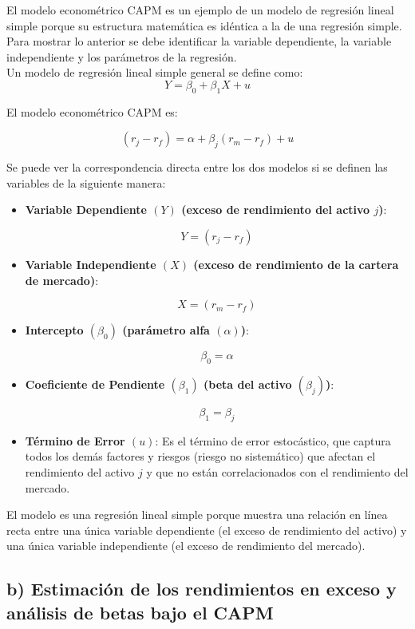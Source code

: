 \documentclass[12pt]{article}
\begin{document}
El modelo econométrico CAPM es un ejemplo de un 
modelo de regresión lineal simple porque su estructura matemática es idéntica a la de una regresión simple. 
Para mostrar lo anterior se debe identificar la variable dependiente, la variable independiente y los parámetros de la regresión.\\

Un modelo de regresión lineal simple general se define como:
\[
Y = \beta_{0} + \beta_{1}X + u
\]

El modelo econométrico CAPM es:

\[
(r_{j} - r_{f}) = \alpha + \beta_{j}(r_{m} - r_{f}) + u
\]

Se puede ver la correspondencia directa entre los dos modelos si se definen las variables de la siguiente manera:

\begin{itemize}
    \item \textbf{Variable Dependiente $(Y)$ (exceso de rendimiento del activo $j$)}: 

    \[
    Y = (r_{j} - r_{f})
    \]
        
    \item \textbf{Variable Independiente $(X)$ (exceso de rendimiento de la cartera de mercado)}: 

    \[
    X = (r_{m} - r_{f})
    \]
    
    \item \textbf{Intercepto $(\beta_{0})$ (parámetro alfa $(\alpha)$)}:

    \[
    \beta_{0} = \alpha
    \]    
    
    \item \textbf{Coeficiente de Pendiente $(\beta_{1})$ (beta del activo $(\beta_{j})$)}:

    \[
    \beta_{1} = \beta_{j}
    \] 
    
    \item \textbf{Término de Error $(u)$}: Es el término de error estocástico, que captura todos los demás factores y riesgos (riesgo no sistemático) 
    que afectan el rendimiento del activo $j$ y que no están correlacionados con el rendimiento del mercado.
\end{itemize}

El modelo es una regresión lineal simple porque muestra una relación en línea recta entre una 
única variable dependiente (el exceso de rendimiento del activo) y una única variable independiente (el exceso de rendimiento del mercado).

\subsection*{b) Estimación de los rendimientos en exceso y análisis de betas bajo el CAPM}
\end{document}
